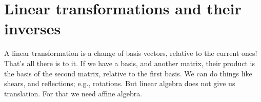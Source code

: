 \section{Linear transformations and their inverses}

A linear transformation is a change of basis vectors, relative to 
the current ones! That's all there is to it. If we have a basis, and 
another matrix, their product is the basis of the second matrix, relative 
to the first basis. We can do things like shears, and reflections; e.g., 
rotations. But linear algebra does not give us translation. For that 
we need affine algebra.